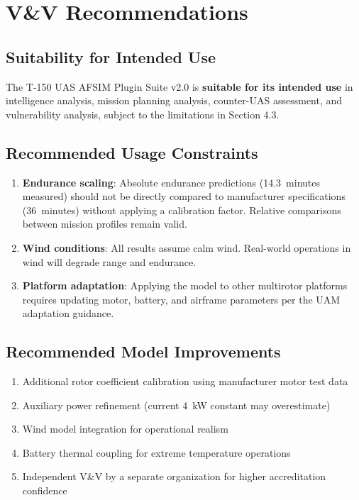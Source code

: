 \documentclass[11pt, letterpaper]{article}
\begin{document}
\pagebreak


\section{\unclass V\&V Recommendations}

\subsection{\unclass Suitability for Intended Use}

\unclass The T-150 UAS AFSIM Plugin Suite v2.0 is \textbf{suitable for its intended use} in intelligence analysis, mission planning analysis, counter-UAS assessment, and vulnerability analysis, subject to the limitations in Section 4.3.

\subsection{\unclass Recommended Usage Constraints}

\begin{enumerate}
    \item \unclass \textbf{Endurance scaling}: Absolute endurance predictions (14.3~minutes measured) should not be directly compared to manufacturer specifications (36~minutes) without applying a calibration factor. Relative comparisons between mission profiles remain valid.
    \item \unclass \textbf{Wind conditions}: All results assume calm wind. Real-world operations in wind will degrade range and endurance.
    \item \unclass \textbf{Platform adaptation}: Applying the model to other multirotor platforms requires updating motor, battery, and airframe parameters per the UAM adaptation guidance.
\end{enumerate}

\subsection{\unclass Recommended Model Improvements}

\begin{enumerate}
    \item \unclass Additional rotor coefficient calibration using manufacturer motor test data
    \item \unclass Auxiliary power refinement (current 4~kW constant may overestimate)
    \item \unclass Wind model integration for operational realism
    \item \unclass Battery thermal coupling for extreme temperature operations
    \item \unclass Independent V\&V by a separate organization for higher accreditation confidence
\end{enumerate}
\end{document}
